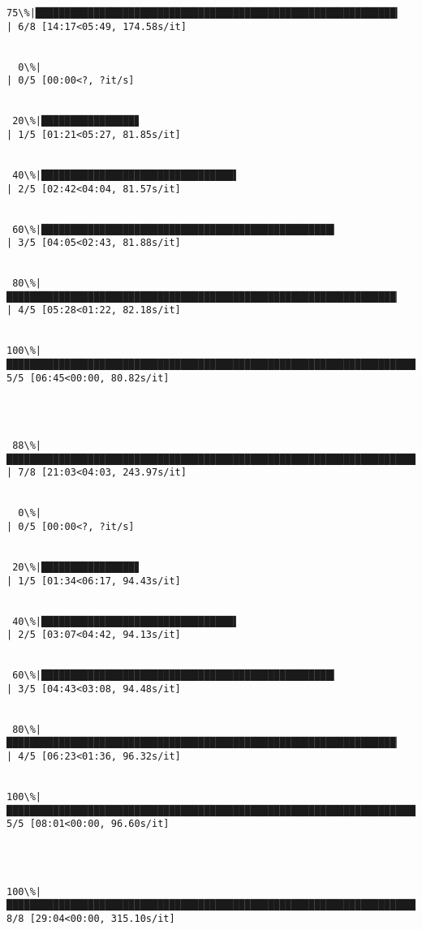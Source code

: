 \documentclass[11pt]{article}
\begin{document}
\begin{Verbatim}[commandchars=\\\{\}]
 75\%|██████████████████████████████████████████████████████████████▎                    | 6/8 [14:17<05:49, 174.58s/it]


  0\%|                                                                                            | 0/5 [00:00<?, ?it/s]


 20\%|████████████████▊                                                                   | 1/5 [01:21<05:27, 81.85s/it]


 40\%|█████████████████████████████████▌                                                  | 2/5 [02:42<04:04, 81.57s/it]


 60\%|██████████████████████████████████████████████████▍                                 | 3/5 [04:05<02:43, 81.88s/it]


 80\%|███████████████████████████████████████████████████████████████████▏                | 4/5 [05:28<01:22, 82.18s/it]


100\%|████████████████████████████████████████████████████████████████████████████████████| 5/5 [06:45<00:00, 80.82s/it]




 88\%|████████████████████████████████████████████████████████████████████████▋          | 7/8 [21:03<04:03, 243.97s/it]


  0\%|                                                                                            | 0/5 [00:00<?, ?it/s]


 20\%|████████████████▊                                                                   | 1/5 [01:34<06:17, 94.43s/it]


 40\%|█████████████████████████████████▌                                                  | 2/5 [03:07<04:42, 94.13s/it]


 60\%|██████████████████████████████████████████████████▍                                 | 3/5 [04:43<03:08, 94.48s/it]


 80\%|███████████████████████████████████████████████████████████████████▏                | 4/5 [06:23<01:36, 96.32s/it]


100\%|████████████████████████████████████████████████████████████████████████████████████| 5/5 [08:01<00:00, 96.60s/it]




100\%|███████████████████████████████████████████████████████████████████████████████████| 8/8 [29:04<00:00, 315.10s/it]


    \end{Verbatim}
\end{document}
